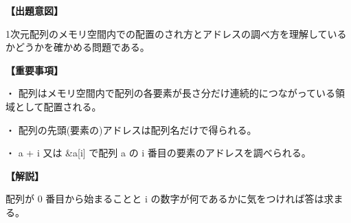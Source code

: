 \noindent \textbf{【出題意図】}

\noindent 1次元配列のメモリ空間内での配置のされ方とアドレスの調べ方を理解しているかどうかを確かめる問題である。

\vspace{1em}
\noindent \textbf{【重要事項】}

\medskip
\noindent ・ 配列はメモリ空間内で配列の各要素が長さ分だけ連続的につながっている領域として配置される。

\medskip
\noindent ・ 配列の先頭(要素の)アドレスは配列名だけで得られる。

\medskip
\noindent ・ a + i 又は \&a[i] で配列 a の i 番目の要素のアドレスを調べられる。

\vspace{1em}
\noindent \textbf{【解説】}

\noindent 配列が 0 番目から始まることと i の数字が何であるかに気をつければ答は求まる。


